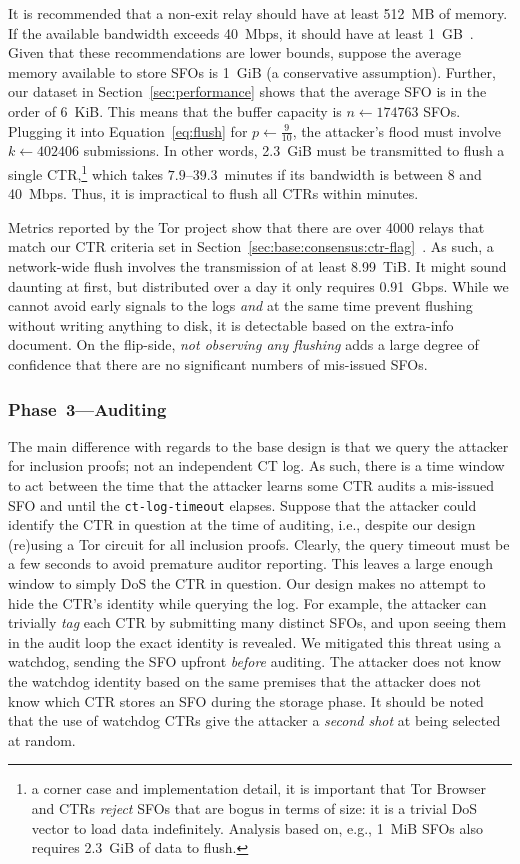 It is recommended that a non-exit relay should have at least 512~MB of memory.
If the available bandwidth exceeds 40~Mbps, it should have at least
1~GB~\cite{relay-config}.  Given that these recommendations are lower bounds,
suppose the average memory available to store SFOs is 1~GiB (a conservative
assumption).  Further, our dataset in Section~\ref{sec:performance} shows that
the average SFO is in the order of 6~KiB.  This means that the buffer capacity
is $n \gets 174763$ SFOs. Plugging it into Equation~\ref{eq:flush} for $p \gets
\frac{9}{10}$, the attacker's flood must involve $k \gets 402406$ submissions.
In other words, 2.3~GiB must be transmitted to flush a single CTR,\footnote{%
a corner case and implementation detail, it is important that Tor Browser and
CTRs \emph{reject} SFOs that are bogus in terms of size: it is a trivial DoS
vector to load data indefinitely. Analysis based on, e.g., 1~MiB SFOs also
requires 2.3~GiB of data to flush.} which takes $7.9$--$39.3$~minutes if its
bandwidth is between 8 and 40~Mbps. Thus, it is impractical to flush all CTRs
within minutes.

Metrics reported by the Tor project show that there are over 4000 relays that
match our CTR criteria set in
Section~\ref{sec:base:consensus:ctr-flag}~\cite{relay-by-flag}.  As such, a
network-wide flush involves the transmission of at least 8.99~TiB.  It might
sound daunting at first, but distributed over a day it only requires 0.91~Gbps.
While we cannot avoid early signals to the logs \emph{and} at the same time
prevent flushing without writing anything to disk, it is detectable based on the
extra-info document.  On the flip-side, \emph{not observing any flushing} adds a
large degree of confidence that there are no significant numbers of mis-issued
SFOs.

\subsubsection{Phase~3---Auditing} \label{sec:auditor:analysis:phase3}
The main difference with regards to the base design is that we query the
attacker for inclusion proofs; not an independent CT log.  As such, there is a
time window to act between the time that the attacker learns some CTR audits a
mis-issued SFO and until the \texttt{ct-log-timeout} elapses.  Suppose that the
attacker could identify the CTR in question at the time of auditing, i.e.,
despite our design (re)using a Tor circuit for all inclusion proofs.  Clearly,
the query timeout must be a few seconds to avoid premature auditor reporting.
This leaves a large enough window to simply DoS the CTR in question.  Our design
makes no attempt to hide the CTR's identity while querying the log.  For
example, the attacker can trivially \emph{tag} each CTR by submitting many
distinct SFOs, and upon seeing them in the audit loop the exact identity is
revealed.  We mitigated this threat using a watchdog, sending the SFO upfront
\emph{before} auditing.  The attacker does not know the watchdog identity based
on the same premises that the attacker does not know which CTR stores an
SFO during the storage phase.  It should be noted that the use of watchdog CTRs
give the attacker a \emph{second shot} at being selected at random.

